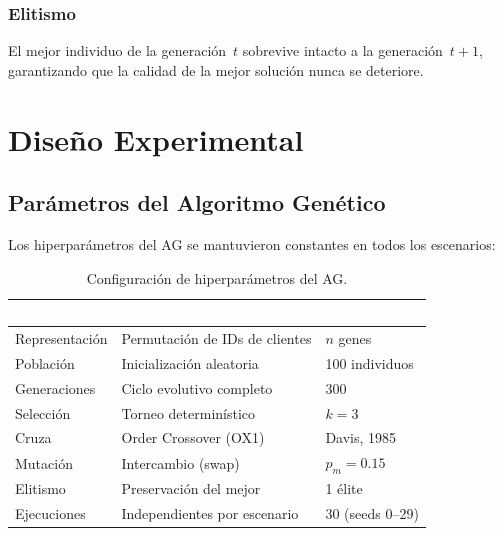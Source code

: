 \documentclass[12pt,letterpaper]{article}
\begin{document}
\subsubsection{Elitismo}
El mejor individuo de la generación~$t$ sobrevive intacto a la generación~$t+1$, garantizando que la calidad de la mejor solución nunca se deteriore.

\section{Diseño Experimental}

\subsection{Parámetros del Algoritmo Genético}

Los hiperparámetros del AG se mantuvieron constantes en todos los escenarios:

\begin{table}[H]
\centering
\caption{Configuración de hiperparámetros del AG.}
\label{tab:ga_params}
\renewcommand{\arraystretch}{1.3}
\begin{tabular}{lll}
    \toprule
    \rowcolor{tablehead}
    \textcolor{white}{\textbf{Componente}} &
    \textcolor{white}{\textbf{Método}} &
    \textcolor{white}{\textbf{Parámetros}} \\
    \midrule
    Representación    & Permutación de IDs de clientes & $n$ genes \\
    \rowcolor{gray!8}
    Población         & Inicialización aleatoria       & 100 individuos \\
    Generaciones      & Ciclo evolutivo completo       & 300 \\
    \rowcolor{gray!8}
    Selección         & Torneo determinístico          & $k = 3$ \\
    Cruza             & Order Crossover (OX1)          & Davis, 1985 \\
    \rowcolor{gray!8}
    Mutación          & Intercambio (swap)             & $p_m = 0.15$ \\
    Elitismo          & Preservación del mejor         & 1 élite \\
    \rowcolor{gray!8}
    Ejecuciones       & Independientes por escenario   & 30 (seeds 0--29) \\
    \bottomrule
\end{tabular}
\end{table}
\end{document}
